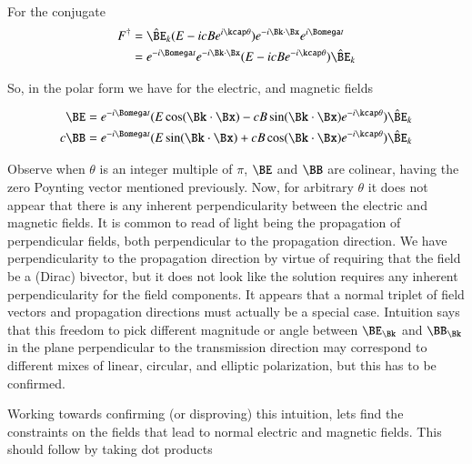 For the conjugate
\begin{align*}
F^\dagger
&=
\hat{\BE}_k
(E - i c B e^{i\kcap \theta})
e^{-i \Bk \cdot \Bx}
e^{i\Bomega t} \\
&=
e^{-i\Bomega t} e^{-i \Bk \cdot \Bx} (E - i c B e^{-i\kcap \theta}) \hat{\BE}_k
\end{align*}

So, in the polar form we have for the electric, and magnetic fields

\begin{align}\label{eqn:fieldsPolar}
\BE &= e^{-i\Bomega t} (E \cos(\Bk \cdot \Bx) - c B \sin(\Bk \cdot \Bx) e^{-i \kcap\theta}) \hat{\BE}_k \\
c \BB &= e^{-i\Bomega t} (E \sin(\Bk \cdot \Bx) + c B \cos(\Bk \cdot \Bx) e^{-i \kcap\theta}) \hat{\BE}_k
\end{align}

Observe when $\theta$ is an integer multiple of $\pi$, $\BE$ and $\BB$ are colinear, having the zero Poynting vector mentioned previously.
Now, for arbitrary $\theta$ it does not appear that there is any inherent perpendicularity between the electric and magnetic fields.  It is common
to read of light being the propagation of perpendicular fields, both perpendicular to the propagation direction.  We have perpendicularity to the
propagation direction by virtue of requiring that the field be a (Dirac) bivector, but it does not look like the solution requires any inherent perpendicularity for the field components.  It appears that a normal triplet of field vectors and propagation directions must actually be a special case.
Intuition says that this freedom to pick different magnitude or angle between $\BE_\Bk$ and $\BB_\Bk$ in the plane perpendicular to the transmission direction may correspond to different mixes of linear, circular, and elliptic polarization, but this has to be confirmed.

Working towards confirming (or disproving) this intuition, lets find the constraints on the fields that lead to normal electric and magnetic fields.  This should follow by taking dot products

